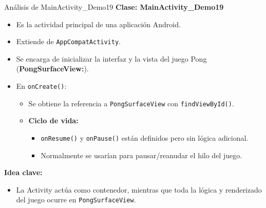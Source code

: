 \begin{frame}[fragile]{Análisis de MainActivity\_Demo19}
\textbf{Clase: MainActivity\_Demo19}

\begin{itemize}
    \item Es la actividad principal de una aplicación Android.
    \item Extiende de \texttt{AppCompatActivity}.
    \item Se encarga de inicializar la interfaz y la vista del juego Pong (\textbf{PongSurfaceView:}).
\end{itemize}


\begin{itemize}
    \item En \texttt{onCreate()}:
    \begin{itemize}
        \item Se obtiene la referencia a \texttt{PongSurfaceView} con \texttt{findViewById()}.
		\item \textbf{Ciclo de vida:}
		\begin{itemize}
			\item \texttt{onResume()} y \texttt{onPause()} están definidos pero sin lógica adicional.
			\item Normalmente se usarían para pausar/reanudar el hilo del juego.
		\end{itemize}
    \end{itemize}
\end{itemize}

\textbf{Idea clave:}
\begin{itemize}
    \item La Activity actúa como contenedor, mientras que toda la lógica y renderizado del juego ocurre en \texttt{PongSurfaceView}.
\end{itemize}

\end{frame}


